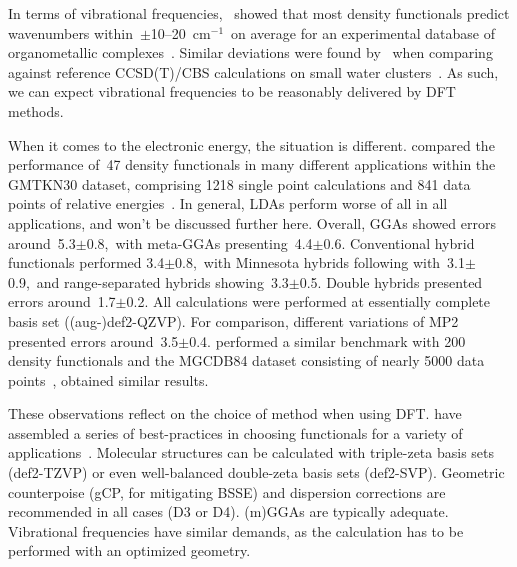 
In terms of vibrational frequencies,~\citeauthor{Katari_2017} showed that most density functionals
predict wavenumbers within~$\pm$10--20~cm$^{-1}$~on average for
an experimental database of organometallic complexes~\cite{Katari_2017}.
Similar deviations were found by~\citeauthor{Howard_2015}
when comparing against reference CCSD(T)/CBS calculations on
small water clusters~\cite{Howard_2015}.
As such,
we can expect vibrational frequencies to be reasonably delivered
by DFT methods.

When it comes to the electronic energy,
the situation is different.
\citeauthor{Goerigk_2011} compared the performance of~47 density functionals
in many different applications
within the GMTKN30 dataset,
comprising 1218 single point calculations
and 841 data points of relative energies~\cite{Goerigk_2011}.
In general,
LDAs perform worse of all in all applications,
and won't be discussed further here.
Overall,
GGAs showed errors around~5.3$\pm$0.8\kcalmol,~with meta-GGAs presenting~4.4$\pm$0.6\kcalmol.
Conventional hybrid functionals performed 3.4$\pm$0.8\kcalmol,~with Minnesota hybrids following with~3.1$\pm$0.9\kcalmol,~and range-separated hybrids showing~3.3$\pm$0.5\kcalmol.
Double hybrids presented errors
\linebreak
around~1.7$\pm$0.2\kcalmol.
All calculations were performed at essentially complete basis set
((aug-)def2-QZVP).
For comparison,
different variations of MP2
presented errors around~3.5$\pm$0.4\kcalmol.
\citeauthor{Mardirossian_2017} performed a similar
benchmark with 200 density functionals and the MGCDB84 dataset
consisting of nearly 5000 data points~\cite{Mardirossian_2017},
obtained similar results.

These observations reflect on the choice of method when using DFT.\@
\citeauthor{Bursch_2022} have assembled a series of best-practices in choosing functionals for a variety of applications~\cite{Bursch_2022}.
Molecular structures can be calculated with triple-zeta basis sets (def2-TZVP)
or even well-balanced double-zeta basis sets (def2-SVP).
Geometric counterpoise (gCP,
for mitigating BSSE) and dispersion corrections are recommended in all cases (D3 or D4).
(m)GGAs are typically adequate.
Vibrational frequencies have similar demands,
as the calculation has to be performed with an optimized geometry.

